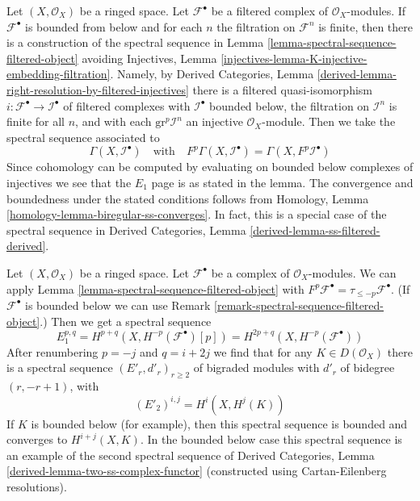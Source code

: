\begin{remark}
\label{remark-spectral-sequence-filtered-object}
Let $(X, \mathcal{O}_X)$ be a ringed space. Let $\mathcal{F}^\bullet$ be a
filtered complex of $\mathcal{O}_X$-modules. If $\mathcal{F}^\bullet$
is bounded from below and for each $n$ the filtration on $\mathcal{F}^n$
is finite, then there is a construction of the spectral sequence
in Lemma \ref{lemma-spectral-sequence-filtered-object}
avoiding Injectives, Lemma
\ref{injectives-lemma-K-injective-embedding-filtration}.
Namely, by
Derived Categories, Lemma
\ref{derived-lemma-right-resolution-by-filtered-injectives}
there is a filtered quasi-isomorphism
$i : \mathcal{F}^\bullet \to \mathcal{I}^\bullet$
of filtered complexes
with $\mathcal{I}^\bullet$ bounded below,
the filtration on $\mathcal{I}^n$ is finite for all $n$,
and with each $\text{gr}^p\mathcal{I}^n$ an
injective $\mathcal{O}_X$-module.
Then we take the spectral sequence associated to
$$
\Gamma(X, \mathcal{I}^\bullet)
\quad\text{with}\quad
F^p\Gamma(X, \mathcal{I}^\bullet) = \Gamma(X, F^p\mathcal{I}^\bullet)
$$
Since cohomology can be computed by evaluating on
bounded below complexes of injectives
we see that the $E_1$ page is as stated in the lemma.
The convergence and boundedness under the stated conditions
follows from
Homology, Lemma \ref{homology-lemma-biregular-ss-converges}.
In fact, this is a special case of the spectral sequence
in Derived Categories, Lemma \ref{derived-lemma-ss-filtered-derived}.
\end{remark}

\begin{example}
\label{example-spectral-sequence}
Let $(X, \mathcal{O}_X)$ be a ringed space. Let $\mathcal{F}^\bullet$ be a
complex of $\mathcal{O}_X$-modules. We can apply
Lemma \ref{lemma-spectral-sequence-filtered-object}
with $F^p\mathcal{F}^\bullet = \tau_{\leq -p}\mathcal{F}^\bullet$.
(If $\mathcal{F}^\bullet$ is bounded below we can use
Remark \ref{remark-spectral-sequence-filtered-object}.)
Then we get a spectral sequence
$$
E_1^{p, q} = H^{p + q}(X, H^{-p}(\mathcal{F}^\bullet)[p]) =
H^{2p + q}(X, H^{-p}(\mathcal{F}^\bullet))
$$
After renumbering $p = -j$ and $q = i + 2j$ we find that for any
$K \in D(\mathcal{O}_X)$ there is a spectral sequence
$(E'_r, d'_r)_{r \geq 2}$ of bigraded modules with
$d'_r$ of bidegree $(r, -r + 1)$, with
$$
(E'_2)^{i, j} = H^i(X, H^j(K))
$$
If $K$ is bounded below (for example), then this spectral sequence
is bounded and converges to $H^{i + j}(X, K)$.
In the bounded below case this spectral sequence is an example
of the second spectral sequence of
Derived Categories, Lemma \ref{derived-lemma-two-ss-complex-functor}
(constructed using Cartan-Eilenberg resolutions).
\end{example}

